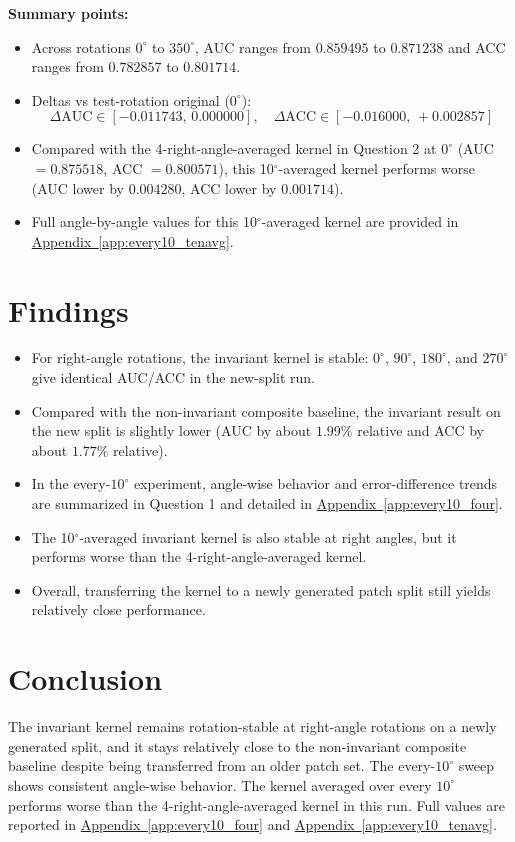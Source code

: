 \documentclass{article}
\begin{document}
\vspace{0.5em}
\textbf{Summary points:}
\begin{itemize}
    \item Across rotations $0^\circ$ to $350^\circ$, AUC ranges from $0.859495$ to $0.871238$ and ACC ranges from $0.782857$ to $0.801714$.
    \item Deltas vs test-rotation original ($0^\circ$):
    \[
    \Delta \text{AUC}\in[-0.011743,\,0.000000],\quad
    \Delta \text{ACC}\in[-0.016000,\,+0.002857]
    \]
    \item Compared with the 4-right-angle-averaged kernel in Question 2 at $0^\circ$ (AUC $=0.875518$, ACC $=0.800571$), this 10$^\circ$-averaged kernel performs worse (AUC lower by $0.004280$, ACC lower by $0.001714$).
    \item Full angle-by-angle values for this 10$^\circ$-averaged kernel are provided in \hyperref[app:every10_tenavg]{Appendix~\ref*{app:every10_tenavg}}.
\end{itemize}

\section*{Findings}
\begin{itemize}
    \item For right-angle rotations, the invariant kernel is stable: $0^\circ$, $90^\circ$, $180^\circ$, and $270^\circ$ give identical AUC/ACC in the new-split run.
    \item Compared with the non-invariant composite baseline, the invariant result on the new split is slightly lower (AUC by about $1.99\%$ relative and ACC by about $1.77\%$ relative).
    \item In the every-$10^\circ$ experiment, angle-wise behavior and error-difference trends are summarized in Question 1 and detailed in \hyperref[app:every10_four]{Appendix~\ref*{app:every10_four}}.
    \item The 10$^\circ$-averaged invariant kernel is also stable at right angles, but it performs worse than the 4-right-angle-averaged kernel.
    \item Overall, transferring the kernel to a newly generated patch split still yields relatively close performance.
\end{itemize}

\section*{Conclusion}
The invariant kernel remains rotation-stable at right-angle rotations on a newly generated split, and it stays relatively close to the non-invariant composite baseline despite being transferred from an older patch set. The every-$10^\circ$ sweep shows consistent angle-wise behavior. The kernel averaged over every $10^\circ$ performs worse than the 4-right-angle-averaged kernel in this run. Full values are reported in \hyperref[app:every10_four]{Appendix~\ref*{app:every10_four}} and \hyperref[app:every10_tenavg]{Appendix~\ref*{app:every10_tenavg}}.
\end{document}
